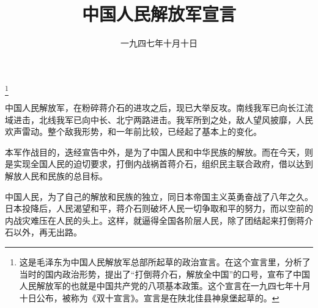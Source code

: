 
\title{中国人民解放军宣言}
\date{一九四七年十月十日}
\thanks{这是毛泽东为中国人民解放军总部所起草的政治宣言。在这个宣言里，分析了当时的国内政治形势，提出了“打倒蒋介石，解放全中国”的口号，宣布了中国人民解放军的也就是中国共产党的八项基本政策。这个宣言在一九四七年十月十日公布，被称为《双十宣言》。宣言是在陕北佳县神泉堡起草的。}
\maketitle


中国人民解放军，在粉碎蒋介石的进攻之后，现已大举反攻。南线我军已向长江流域进击，北线我军已向中长、北宁两路进击。我军所到之处，敌人望风披靡，人民欢声雷动。整个敌我形势，和一年前比较，已经起了基本上的变化。

本军作战目的，迭经宣告中外，是为了中国人民和中华民族的解放。而在今天，则是实现全国人民的迫切要求，打倒内战祸首蒋介石，组织民主联合政府，借以达到解放人民和民族的总目标。

中国人民，为了自己的解放和民族的独立，同日本帝国主义英勇奋战了八年之久。日本投降后，人民渴望和平，蒋介石则破坏人民一切争取和平的努力，而以空前的内战灾难压在人民的头上。这样，就逼得全国各阶层人民，除了团结起来打倒蒋介石以外，再无出路。

